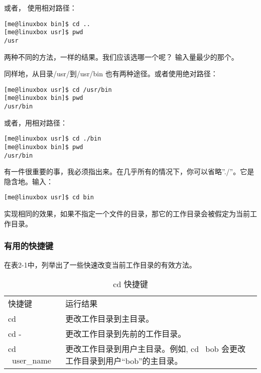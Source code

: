 \par 或者， 使用相对路径：

\begin{lstlisting}
[me@linuxbox bin]$ cd ..
[me@linuxbox usr]$ pwd
/usr
\end{lstlisting}

\par 两种不同的方法，一样的结果。我们应该选哪一个呢？ 输入量最少的那个。

\par 同样地，从目录/usr/到/usr/bin 也有两种途径。或者使用绝对路径：

\begin{lstlisting}
[me@linuxbox usr]$ cd /usr/bin
[me@linuxbox bin]$ pwd
/usr/bin
\end{lstlisting}

\par 或者，用相对路径：

\begin{lstlisting}
[me@linuxbox usr]$ cd ./bin
[me@linuxbox bin]$ pwd
/usr/bin
\end{lstlisting}

\par 有一件很重要的事，我必须指出来。在几乎所有的情况下，你可以省略”./”。它是隐含地。输入：
\begin{lstlisting}
[me@linuxbox usr]$ cd bin
\end{lstlisting}

\par 实现相同的效果，如果不指定一个文件的目录，那它的工作目录会被假定为当前工作目录。


\subsubsection{有用的快捷键} %
\label{ssub:有用的快捷键}
在表2-1中，列举出了一些快速改变当前工作目录的有效方法。


\begin{table}[ht!]
\caption{cd 快捷键}
\label{table0}
\centering
\begin{tabular}{p{3cm}p{8cm}}
\rowcolor[gray]{0.8}
 快捷键 & 运行结果 \\

  cd	& 更改工作目录到主目录。 \\
\midrule
  cd -	& 更改工作目录到先前的工作目录。\\
\midrule
cd ~user\_name	& 更改工作目录到用户主目录。例如, cd ~bob 会更改工作目录到用户“bob”的主目录。\\
\bottomrule
\end{tabular}
\end{table}

